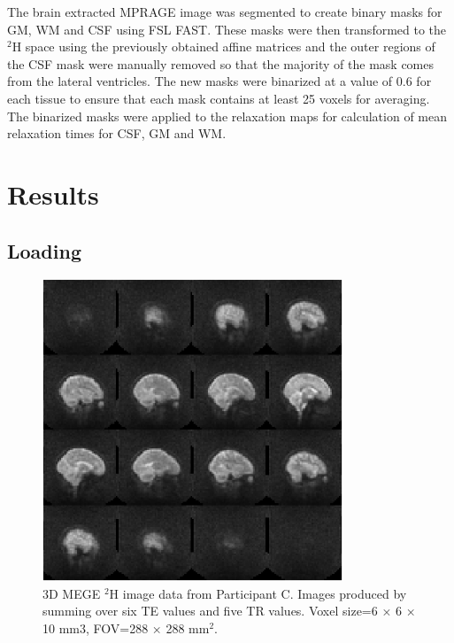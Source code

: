 \documentclass[class=article, crop=false]{standalone}
\begin{document}
The brain extracted MPRAGE image was segmented to create binary masks for GM, WM and CSF using FSL FAST\cite{Zhang2001SegmentationAlgorithm}. These masks were then transformed to the $^2$H space using the previously obtained affine matrices and the outer regions of the CSF mask were manually removed so that the majority of the mask comes from the lateral ventricles. The new masks were binarized at a value of 0.6 for each tissue to ensure that each mask contains at least 25 voxels for averaging. The binarized masks were applied to the relaxation maps for calculation of mean relaxation times for CSF, GM and WM.

\section{Results}
\subsection{Loading}

\begin{figure}
    \centering
    \includegraphics[width=0.8\textwidth]{Figures/D2O/Sag_Full.png}
    \caption{3D MEGE $^2$H image data from Participant C. Images produced by summing over six TE values and five TR values. Voxel size=6 × 6 × 10 mm3, FOV=288 × 288 mm$^2$.}
    \label{fig:D2O:Sag_Full}
\end{figure}
\end{document}

